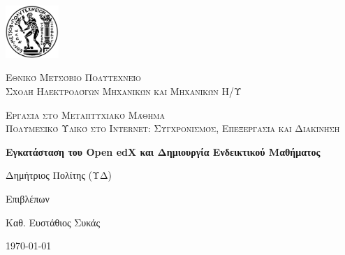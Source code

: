 \documentclass[12pt]{report}
\newcommand\blankpage{%
    \null
    \thispagestyle{empty}%
    \addtocounter{page}{-1}%
    \newpage}
\begin{document}

\hypersetup{pageanchor=false}

\begin{titlepage}
  \centering
  \includegraphics[width=0.15\textwidth]{pyrforos}\par\vspace{1cm}
  {\scshape\LARGE Εθνικό Μετσόβιο Πολυτεχνείο\\
  Σχολή Ηλεκτρολόγων Μηχανικών και Μηχανικών Η/Υ\par}
  \vspace{1cm}
  {\scshape\Large Εργασία στο Μεταπτυχιακό Μάθημα\\
  Πολυμεσικό Υλικό στο Internet: Συγχρονισμός, Επεξεργασία και Διακίνηση\par}
  \vspace{1.5cm}
  {\Large\bfseries Εγκατάσταση του \textlatin{Open edX} και Δημιουργία Ενδεικτικού Μαθήματος\par}
  \vspace{2cm}
  {\large Δημήτριος Πολίτης (ΥΔ)\par}
  \vfill
  Επιβλέπων \par
  Καθ. Ευστάθιος Συκάς

  \vfill

  {\large \today\par}
  \afterpage{\blankpage}
\end{titlepage}

\tableofcontents
\thispagestyle{empty}

\listoffigures
\thispagestyle{empty}

\begin{abstract}
Στο παρόν παρουσιάζεται η λειτουργία και η διαδικασία ανάπτυξης ενός μαθήματος στην πλατφόρμα \textlatin{Open-EDX}. Αρχικά  γίνεται αναφορά στην εν λόγω πλατφόρμα ηλεκτρονικής μάθησης και στη συνέχεια περιγράφεται αναλυτικά η διαδικασία εγκατάστασης της, με τη χρήση αυτοματοποιημένων εργαλείων (\textlatin{ansible, vagrant}). Τέλος περιγράφεται ο τρόπος δημιουργίας εντός τής πλατφόρμας, ενός ενδεικτικού μαθήματος. Η εργασία είναι διαθέσιμη από το σύνδεσμο \textlatin{\url{https://github.com/dpolitis/open-edx-install}}.

\vspace{10mm}

\noindent \textbf{Λέξεις κλειδιά:} Ηλεκτρονική Μάθηση, Ανοιχτός Κώδικας, Διαδίκτυο.
\end{abstract}
\end{document}
